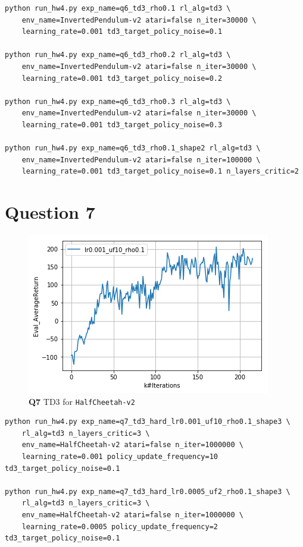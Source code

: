 \documentclass[11pt]{article}
\begin{document}
\begin{verbatim}
python run_hw4.py exp_name=q6_td3_rho0.1 rl_alg=td3 \
    env_name=InvertedPendulum-v2 atari=false n_iter=30000 \
    learning_rate=0.001 td3_target_policy_noise=0.1

python run_hw4.py exp_name=q6_td3_rho0.2 rl_alg=td3 \
    env_name=InvertedPendulum-v2 atari=false n_iter=30000 \
    learning_rate=0.001 td3_target_policy_noise=0.2

python run_hw4.py exp_name=q6_td3_rho0.3 rl_alg=td3 \
    env_name=InvertedPendulum-v2 atari=false n_iter=30000 \
    learning_rate=0.001 td3_target_policy_noise=0.3

python run_hw4.py exp_name=q6_td3_rho0.1_shape2 rl_alg=td3 \
    env_name=InvertedPendulum-v2 atari=false n_iter=100000 \
    learning_rate=0.001 td3_target_policy_noise=0.1 n_layers_critic=2
\end{verbatim}

\clearpage


\section{Question 7}
\label{sec:org40d73b1}

\begin{figure}[htbp]
\centering
\includegraphics[width=.9\linewidth]{./7.png}
\caption{\textbf{Q7} TD3 for \texttt{HalfCheetah-v2}}
\end{figure}

\begin{verbatim}
python run_hw4.py exp_name=q7_td3_hard_lr0.001_uf10_rho0.1_shape3 \
    rl_alg=td3 n_layers_critic=3 \
    env_name=HalfCheetah-v2 atari=false n_iter=1000000 \
    learning_rate=0.001 policy_update_frequency=10 td3_target_policy_noise=0.1

python run_hw4.py exp_name=q7_td3_hard_lr0.0005_uf2_rho0.1_shape3 \
    rl_alg=td3 n_layers_critic=3 \
    env_name=HalfCheetah-v2 atari=false n_iter=1000000 \
    learning_rate=0.0005 policy_update_frequency=2 td3_target_policy_noise=0.1
\end{verbatim}
\end{document}
